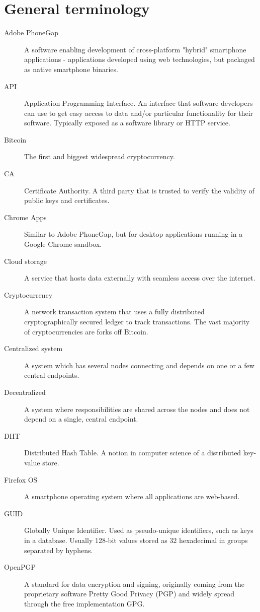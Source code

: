 \section{General terminology}
\begin{description}
  \item[Adobe PhoneGap] A software enabling development of cross-platform "hybrid" smartphone applications - applications developed using web technologies, but packaged as native smartphone binaries.
  \item[API] Application Programming Interface. An interface that software developers can use to get easy access to data and/or particular functionality for their software. Typically exposed as a software library or HTTP service.
  \item[Bitcoin] The first and biggest widespread cryptocurrency.
  \item[CA] Certificate Authority. A third party that is trusted to verify the validity of public keys and certificates.
  \item[Chrome Apps] Similar to Adobe PhoneGap, but for desktop applications running in a Google Chrome sandbox.
  \item[Cloud storage] A service that hosts data externally with seamless access over the internet.
  \item[Cryptocurrency] A network transaction system that uses a fully distributed cryptographically secured ledger to track transactions. The vast majority of cryptocurrencies are forks off Bitcoin.
  \item[Centralized system] A system which has several nodes connecting and depends on one or a few central endpoints.
  \item[Decentralized] A system where responsibilities are shared across the nodes and does not depend on a single, central endpoint.
  \item[DHT] Distributed Hash Table. A notion in computer science of a distributed key-value store.
  \item[Firefox OS] A smartphone operating system where all applications are web-based.
  \item[GUID] Globally Unique Identifier. Used as pseudo-unique identifiers, such as keys in a database. Usually 128-bit values stored as 32 hexadecimal in groups separated by hyphens. 
  \item[OpenPGP] A standard for data encryption and signing, originally coming from the proprietary software Pretty Good Privacy (PGP) and widely spread through the free implementation GPG.

\end{description}
